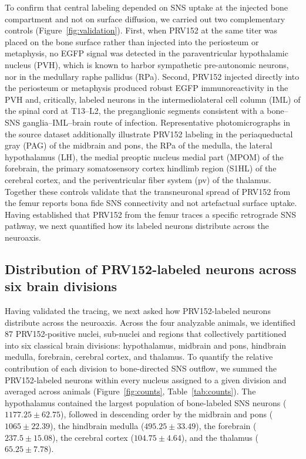 \documentclass[11pt]{article}
\begin{document}
To confirm that central labeling depended on SNS uptake at the injected bone compartment and not on surface diffusion, we carried out two complementary controls (Figure~\ref{fig:validation}). First, when PRV152 at the same titer was placed on the bone surface rather than injected into the periosteum or metaphysis, no EGFP signal was detected in the paraventricular hypothalamic nucleus (PVH), which is known to harbor sympathetic pre-autonomic neurons, nor in the medullary raphe pallidus (RPa). Second, PRV152 injected directly into the periosteum or metaphysis produced robust EGFP immunoreactivity in the PVH and, critically, labeled neurons in the intermediolateral cell column (IML) of the spinal cord at T13--L2, the preganglionic segments consistent with a bone--SNS ganglia--IML--brain route of infection. Representative photomicrographs in the source dataset additionally illustrate PRV152 labeling in the periaqueductal gray (PAG) of the midbrain and pons, the RPa of the medulla, the lateral hypothalamus (LH), the medial preoptic nucleus medial part (MPOM) of the forebrain, the primary somatosensory cortex hindlimb region (S1HL) of the cerebral cortex, and the periventricular fiber system (pv) of the thalamus. Together these controls validate that the transneuronal spread of PRV152 from the femur reports bona fide SNS connectivity and not artefactual surface uptake. Having established that PRV152 from the femur traces a specific retrograde SNS pathway, we next quantified how its labeled neurons distribute across the neuroaxis.

\subsection{Distribution of PRV152-labeled neurons across six brain divisions}

Having validated the tracing, we next asked how PRV152-labeled neurons distribute across the neuroaxis. Across the four analyzable animals, we identified 87 PRV152-positive nuclei, sub-nuclei and regions that collectively partitioned into six classical brain divisions: hypothalamus, midbrain and pons, hindbrain medulla, forebrain, cerebral cortex, and thalamus. To quantify the relative contribution of each division to bone-directed SNS outflow, we summed the PRV152-labeled neurons within every nucleus assigned to a given division and averaged across animals (Figure~\ref{fig:counts}, Table~\ref{tab:counts}). The hypothalamus contained the largest population of bone-labeled SNS neurons ($1177.25 \pm 62.75$), followed in descending order by the midbrain and pons ($1065 \pm 22.39$), the hindbrain medulla ($495.25 \pm 33.49$), the forebrain ($237.5 \pm 15.08$), the cerebral cortex ($104.75 \pm 4.64$), and the thalamus ($65.25 \pm 7.78$).
\end{document}
